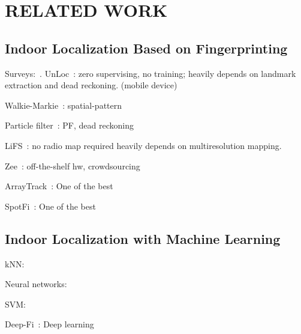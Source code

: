 \documentclass[letterpaper, 10 pt, conference]{ieeeconf}  %
\begin{document}
\section{\label{sec-RW}RELATED WORK}
  \subsection{Indoor Localization Based on Fingerprinting}
    Surveys:~\cite{he2016wi, hossain2015survey, liu2007survey}.
    UnLoc~\cite{wang2012no}: zero supervising, no training; heavily depends on landmark extraction and dead reckoning. (mobile device)

    Walkie-Markie~\cite{shen2013walkie}: spatial-pattern


    Particle filter~\cite{biswas2010wifi}: PF, dead reckoning

    LiFS~\cite{yang2012locating}: no radio map required heavily depends on multiresolution mapping.

    Zee~\cite{rai2012zee}: off-the-shelf hw, crowdsourcing

    ArrayTrack~\cite{xiong2013arraytrack}: One of the best

    SpotFi~\cite{kotaru2015spotfi}: One of the best


  \subsection{Indoor Localization with Machine Learning}
    kNN:~\cite{liu2007survey}

    Neural networks:~\cite{dayekh2010cooperative}

    SVM:~\cite{wu2007location}

    Deep-Fi~\cite{wang2016csi}: Deep learning
\end{document}
